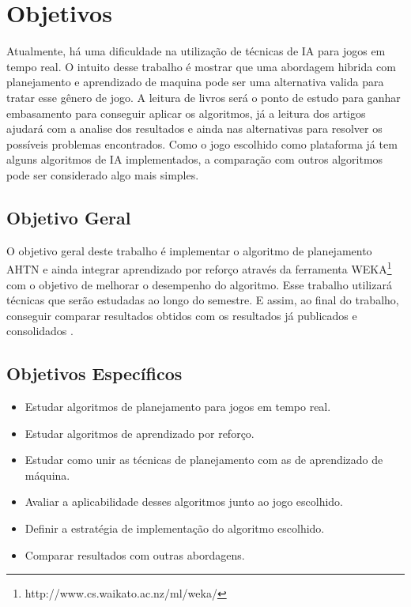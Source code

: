 \chapter{\label{chap:obje}Objetivos}

Atualmente, há uma dificuldade na utilização de técnicas de IA para jogos em tempo real. O intuito desse trabalho é mostrar que uma abordagem hibrida com planejamento e aprendizado de maquina pode ser uma alternativa valida para tratar esse gênero de jogo. A leitura de livros será o ponto de estudo para ganhar embasamento para conseguir aplicar os algoritmos, já a leitura dos artigos ajudará com a analise dos resultados e ainda nas alternativas para resolver os possíveis problemas encontrados. Como o jogo escolhido como plataforma já tem alguns algoritmos de IA implementados, a comparação com outros algoritmos pode ser considerado algo mais simples.  \\ 

\section{Objetivo Geral}

O objetivo geral deste trabalho é implementar o algoritmo de planejamento AHTN \cite{ontanon2015adversarial} e ainda integrar aprendizado por reforço através da ferramenta WEKA\footnote{http://www.cs.waikato.ac.nz/ml/weka/} com o objetivo de melhorar o desempenho do algoritmo. Esse trabalho utilizará técnicas que serão estudadas ao longo do semestre. E assim, ao final do trabalho, conseguir comparar resultados obtidos com os resultados já publicados e consolidados \cite{ontanon2007case,ontanon2012experiments,hogg2010learning,buro2003real,ontanon2013survey}.  

\section{Objetivos Específicos}
\label{obj:esp}
\begin{itemize}
\item Estudar algoritmos de planejamento para jogos em tempo real.
\item Estudar algoritmos de aprendizado por reforço.
\item Estudar como unir as técnicas de planejamento com as de aprendizado de máquina.
\item Avaliar a aplicabilidade desses algoritmos junto ao jogo escolhido.
\item Definir a estratégia de implementação do algoritmo escolhido.
\item Comparar resultados com outras abordagens.
\end{itemize}


